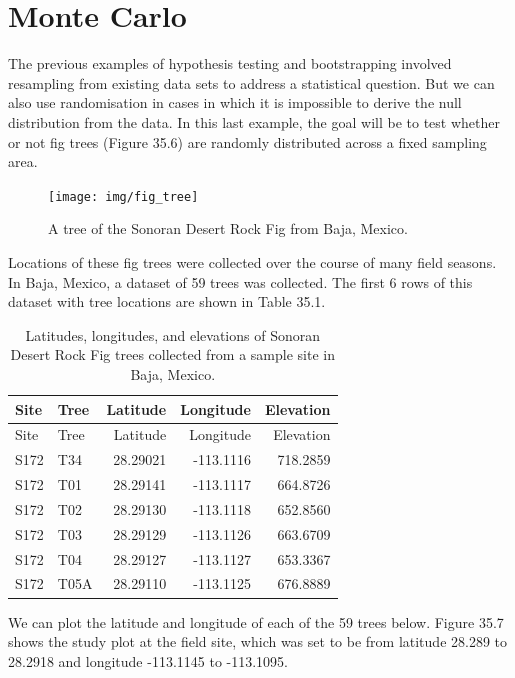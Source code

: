 \documentclass[
]{scrbook}
\begin{document}
\hypertarget{monte-carlo}{%
\section{Monte Carlo}\label{monte-carlo}}

The previous examples of hypothesis testing and bootstrapping involved resampling from existing data sets to address a statistical question.
But we can also use randomisation in cases in which it is impossible to derive the null distribution from the data.
In this last example, the goal will be to test whether or not fig trees (Figure 35.6) are randomly distributed across a fixed sampling area.

\begin{figure}
\texttt{[image: img/fig\_tree]} \caption{A tree of the Sonoran Desert Rock Fig from Baja, Mexico.}\label{fig:unnamed-chunk-188}
\end{figure}

Locations of these fig trees were collected over the course of many field seasons.
In Baja, Mexico, a dataset of 59 trees was collected.
The first 6 rows of this dataset with tree locations are shown in Table 35.1.

\begin{longtable}[]{@{}llrrr@{}}
\caption{\label{tab:unnamed-chunk-190}Latitudes, longitudes, and elevations of Sonoran Desert Rock Fig trees collected from a sample site in Baja, Mexico.}\tabularnewline
\toprule
Site & Tree & Latitude & Longitude & Elevation \\
\midrule
\endfirsthead
\toprule
Site & Tree & Latitude & Longitude & Elevation \\
\midrule
\endhead
S172 & T34 & 28.29021 & -113.1116 & 718.2859 \\
S172 & T01 & 28.29141 & -113.1117 & 664.8726 \\
S172 & T02 & 28.29130 & -113.1118 & 652.8560 \\
S172 & T03 & 28.29129 & -113.1126 & 663.6709 \\
S172 & T04 & 28.29127 & -113.1127 & 653.3367 \\
S172 & T05A & 28.29110 & -113.1125 & 676.8889 \\
\bottomrule
\end{longtable}

We can plot the latitude and longitude of each of the 59 trees below.
Figure 35.7 shows the study plot at the field site, which was set to be from latitude 28.289 to 28.2918 and longitude -113.1145 to -113.1095.
\end{document}
